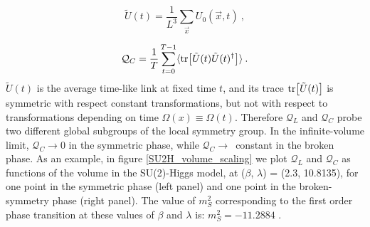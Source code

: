\begin{equation}
\tilde U(t) = \frac{1}{L^3} \sum_{\vec x} U_{0}(\vec x,t) \: ,
\end{equation}

\begin{equation}
\mathcal Q_C = \frac{1}{T} \sum_{t=0}^{T-1} \langle \tr [\tilde U(t) \tilde U(t)^{\dagger}] \rangle \: .
\end{equation}
%
$\tilde U(t)$ is the average time-like link at fixed time $t$, and its trace $\tr [\tilde U(t)]$ is symmetric with respect constant transformations, but not with respect to transformations depending on time $\Omega (x) \equiv \Omega (t)$. Therefore $\mathcal Q_L$ and $\mathcal Q_C$ probe two different global subgroups of the local symmetry group. In the infinite-volume limit, $\mathcal Q_C \to 0$ in the symmetric phase, while $\mathcal Q_C \to$~constant in the broken phase. As an example, in figure \ref{SU2H_volume_scaling} we plot $\mathcal Q_L$ and $\mathcal Q_C$ as functions of the volume in the SU(2)-Higgs model, at ($\beta$, $\lambda$) = (2.3, 10.8135), for one point in the symmetric phase (left panel) and one point in the broken-symmetry phase (right panel). The value of $m_S^2$ corresponding to the first order phase transition at these values of $\beta$ and $\lambda$ is: $m_S^2 = -11.2884$ \cite{Langguth:1985eu}.



